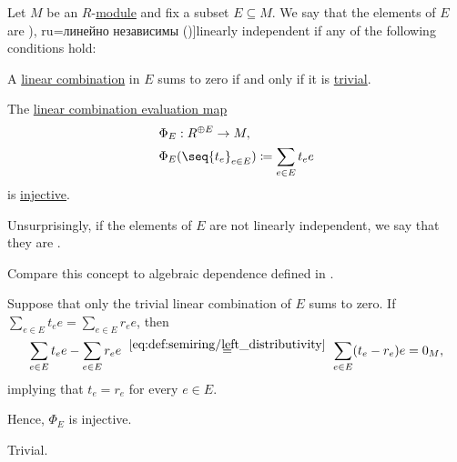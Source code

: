\begin{definition}\label{def:linear_dependence}\mimprovised
  Let \( M \) be an \( R \)-\hyperref[def:module]{module} and fix a subset \( E \subseteq M \). We say that the elements of \( E \) are \term[bg=линейно независими (\cite[\textnumero 2.1.3]{ПетровЗяпков2010}), ru=линейно независимы (\cite[sec. 3.4]{Тыртышников2007})]{linearly independent} if any of the following conditions hold:

  \begin{thmenum}
     A \hyperref[rem:linear_combinations]{linear combination} in \( E \) sums to zero if and only if it is \hyperref[def:free_semimodule]{trivial}.

     The \hyperref[thm:free_semimodule_universal_property]{linear combination evaluation map}
    \begin{equation*}
      \begin{aligned}
        &\Phi_E: R^{\oplus E} \to M, \\
        &\Phi_E( \seq{ t_e }_{e \in E} ) \coloneqq \sum_{e \in E} t_e e
      \end{aligned}
    \end{equation*}
    is \hyperref[def:function_invertibility/injective]{injective}.
  \end{thmenum}

  Unsurprisingly, if the elements of \( E \) are not linearly independent, we say that they are .
\end{definition}
\begin{comments}
  \item Compare this concept to algebraic dependence defined in .
\end{comments}
\begin{defproof}
   Suppose that only the trivial linear combination of \( E \) sums to zero. If \( \sum_{e \in E} t_e e = \sum_{e \in E} r_e e \), then
  \begin{equation*}
    \sum_{e \in E} t_e e - \sum_{e \in E} r_e e
    \reloset {\eqref{eq:def:semiring/left_distributivity}} =
    \sum_{e \in E} (t_e - r_e) e
    =
    0_M,
  \end{equation*}
  implying that \( t_e = r_e \) for every \( e \in E \).

  Hence, \( \Phi_E \) is injective.

   Trivial.
\end{defproof}

